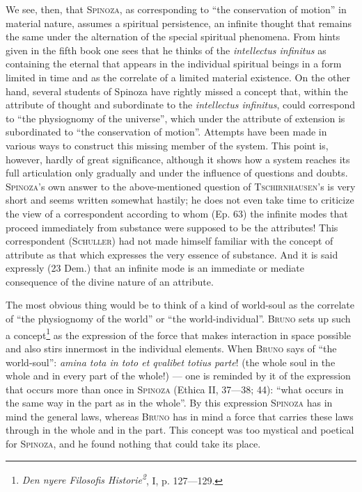 \documentclass[12pt]{article}
\newcommand{\opage}[1]{\marginnote{\footnotesize\textit{[#1]}}}
\begin{document}
We see, then, that \textsc{Spinoza}, as corresponding to ``the conservation of motion''
in material nature, assumes a spiritual persistence, an infinite thought that remains the
same under the alternation of the special spiritual phenomena. From hints given
\opage{30}in the fifth book one sees that he thinks of the \textit{intellectus infinitus}
as containing the eternal that appears in the individual spiritual beings in a form
limited in time and as the correlate of a limited material existence. On the other hand,
several students of Spinoza have rightly missed a concept that, within the attribute of
thought and subordinate to the \textit{intellectus infinitus}, could correspond to ``the
physiognomy of the universe'', which under the attribute of extension is subordinated to
``the conservation of motion''. Attempts have been made in various ways to construct this
missing member of the system. This point is, however, hardly of great significance,
although it shows how a system reaches its full articulation only gradually and under the
influence of questions and doubts. \textsc{Spinoza}'s own answer to the above-mentioned
question of \textsc{Tschirnhausen}'s is very short and seems written somewhat hastily;
he does not even take time to criticize the view of a correspondent according to whom
(Ep. 63) the infinite modes that proceed immediately from substance were supposed to be
the attributes! This correspondent (\textsc{Schuller}) had not made himself familiar with
the concept of attribute as that which expresses the very essence of substance. And it is
said expressly (23 Dem.) that an infinite mode is an immediate or mediate consequence of
the divine nature of an attribute.

The most obvious thing would be to think of a kind of world-soul as the correlate of ``the
physiognomy of the world'' or ``the world-individual''. \textsc{Bruno} sets up such a
concept\footnote{\textit{Den nyere Filosofis Historie\textsuperscript{2}}, I, p.
127---129.} as the expression of the force that makes interaction in space possible and
also stirs innermost in the individual elements. When \textsc{Bruno} says of ``the
world-soul'': \textit{amina tota in toto et qvalibet totius parte}! (the whole soul in %
the whole and in every part of the whole!) --- one is reminded by it of the expression
that occurs more than once in \textsc{Spinoza} (Ethica II, 37---38; 44): ``what occurs
in the same way in the part as in the whole''. By this expression \textsc{Spinoza} has in
mind the general laws, whereas \textsc{Bruno} has in mind a force that carries these laws
through in the whole and in the part. This concept was too mystical and poetical for
\textsc{Spinoza}, and he found nothing that could take its place.
\end{document}
